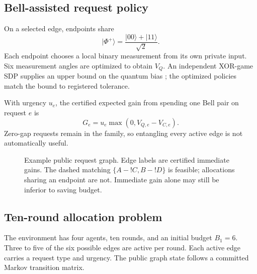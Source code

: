 \documentclass[10pt,twocolumn]{article}
\begin{document}
\subsection{Bell-assisted request policy}
On a selected edge, endpoints share
\begin{equation}
 |\Phi^+\rangle=\frac{|00\rangle+|11\rangle}{\sqrt{2}}.
\end{equation}
Each endpoint chooses a local binary measurement from its own private input. Six measurement angles are optimized to obtain $V_Q$. An independent XOR-game SDP supplies an upper bound on the quantum bias \cite{cleve2004consequences,tsirelson1980quantum}; the optimized policies match the bound to registered tolerance.

With urgency $u_e$, the certified expected gain from spending one Bell pair on request $e$ is
\begin{equation}
 G_e=u_e\max(0,V_{Q,e}-V_{C,e}).
 \label{eq:gain}
\end{equation}
Zero-gap requests remain in the family, so entangling every active edge is not automatically useful.

\begin{figure}[t]
\centering
{}
\caption{Example public request graph. Edge labels are certified immediate gains. The dashed matching $\{A\!-!C,B\!-!D\}$ is feasible; allocations sharing an endpoint are not. Immediate gain alone may still be inferior to saving budget.}
\label{fig:graph}
\end{figure}

\subsection{Ten-round allocation problem}
The environment has four agents, ten rounds, and an initial budget $B_1=6$. Three to five of the six possible edges are active per round. Each active edge carries a request type and urgency. The public graph state follows a committed Markov transition matrix.
\end{document}
